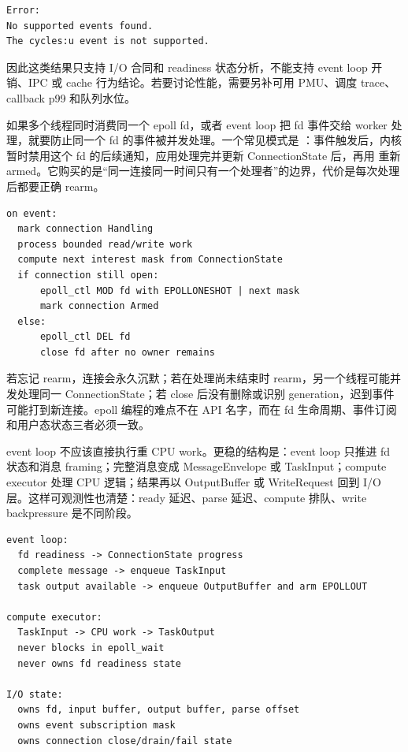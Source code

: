 \begin{lstlisting}[numbers=none,caption={perf 计数器边界}]
Error:
No supported events found.
The cycles:u event is not supported.
\end{lstlisting}

因此这类结果只支持 I/O 合同和 readiness 状态分析，不能支持 event loop 开销、IPC 或 cache 行为结论。若要讨论性能，需要另补可用 PMU、调度 trace、callback p99 和队列水位。

如果多个线程同时消费同一个 epoll fd，或者 event loop 把 fd 事件交给 worker 处理，就要防止同一个 fd 的事件被并发处理。一个常见模式是 ：事件触发后，内核暂时禁用这个 fd 的后续通知，应用处理完并更新 ConnectionState 后，再用  重新 armed。它购买的是“同一连接同一时间只有一个处理者”的边界，代价是每次处理后都要正确 rearm。

\begin{lstlisting}[numbers=none,caption={one-shot reactor 的 rearm 协议}]
on event:
  mark connection Handling
  process bounded read/write work
  compute next interest mask from ConnectionState
  if connection still open:
      epoll_ctl MOD fd with EPOLLONESHOT | next mask
      mark connection Armed
  else:
      epoll_ctl DEL fd
      close fd after no owner remains
\end{lstlisting}

若忘记 rearm，连接会永久沉默；若在处理尚未结束时 rearm，另一个线程可能并发处理同一 ConnectionState；若 close 后没有删除或识别 generation，迟到事件可能打到新连接。epoll 编程的难点不在 API 名字，而在 fd 生命周期、事件订阅和用户态状态三者必须一致。

event loop 不应该直接执行重 CPU work。更稳的结构是：event loop 只推进 fd 状态和消息 framing；完整消息变成 MessageEnvelope 或 TaskInput；compute executor 处理 CPU 逻辑；结果再以 OutputBuffer 或 WriteRequest 回到 I/O 层。这样可观测性也清楚：ready 延迟、parse 延迟、compute 排队、write backpressure 是不同阶段。

\begin{lstlisting}[numbers=none,caption={reactor 和 compute executor 的分层}]
event loop:
  fd readiness -> ConnectionState progress
  complete message -> enqueue TaskInput
  task output available -> enqueue OutputBuffer and arm EPOLLOUT

compute executor:
  TaskInput -> CPU work -> TaskOutput
  never blocks in epoll_wait
  never owns fd readiness state

I/O state:
  owns fd, input buffer, output buffer, parse offset
  owns event subscription mask
  owns connection close/drain/fail state
\end{lstlisting}

